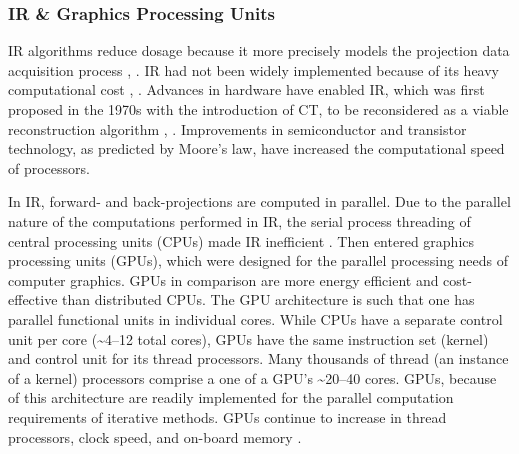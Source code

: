 \documentclass{bmcart}
\begin{document}
\subsubsection*{IR \& Graphics Processing Units}
IR algorithms reduce dosage because it more precisely models the projection data acquisition process \cite{liu_model-based_2014}, \cite{beister_iterative_2012}. IR had not been widely implemented because of its heavy computational cost \cite{geyer_state_2015}, \cite{liu_model-based_2014}. Advances in hardware have enabled IR, which was first proposed in the 1970s with the introduction of CT, to be reconsidered as a viable reconstruction algorithm \cite{liu_model-based_2014}, \cite{geyer_state_2015}. Improvements in semiconductor and transistor technology, as predicted by Moore's law, have increased the computational speed of processors.
\par In IR, forward- and back-projections are computed in parallel. Due to the parallel nature of the computations performed in IR, the serial process threading of central processing units (CPUs) made IR inefficient \cite{beister_iterative_2012}. Then entered graphics processing units (GPUs), which were designed for the parallel processing needs of computer graphics. GPUs in comparison are more energy efficient and cost-effective than distributed CPUs. The GPU architecture is such that one has parallel functional units in individual cores. While CPUs have a separate control unit per core (\textasciitilde{}4--12 total cores), GPUs have the same instruction set (kernel) and control unit for its thread processors. Many thousands of thread (an instance of a kernel) processors comprise a one of a GPU's \textasciitilde{}20--40 cores. GPUs, because of this architecture are readily implemented for the parallel computation requirements of iterative methods. GPUs continue to increase in thread processors, clock speed, and on-board memory \cite{smistad_medical_2015}. 
\end{document}

